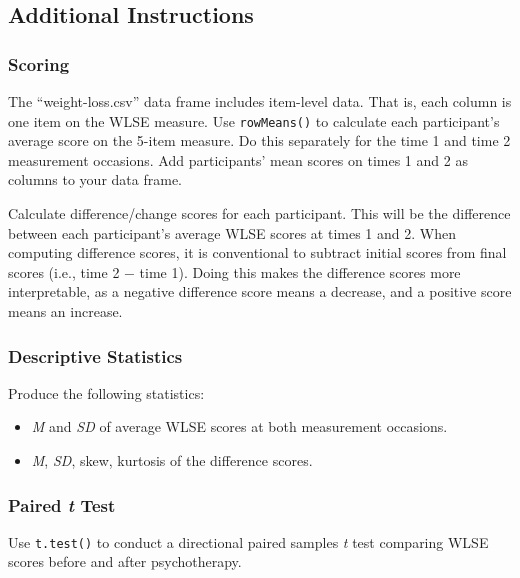 \documentclass[
]{book}
\providecommand{\tightlist}{%
  \setlength{\itemsep}{0pt}\setlength{\parskip}{0pt}}
\begin{document}
\hypertarget{pst-additional-instructions}{%
\subsection{Additional Instructions}\label{pst-additional-instructions}}

\hypertarget{pst-scoring}{%
\subsubsection{Scoring}\label{pst-scoring}}

The ``weight-loss.csv'' data frame includes item-level data. That is, each column is one item on the WLSE measure. Use \texttt{rowMeans()} to calculate each participant's average score on the 5-item measure. Do this separately for the time 1 and time 2 measurement occasions. Add participants' mean scores on times 1 and 2 as columns to your data frame.

Calculate difference/change scores for each participant. This will be the difference between each participant's average WLSE scores at times 1 and 2. When computing difference scores, it is conventional to subtract initial scores from final scores (i.e., time 2 − time 1). Doing this makes the difference scores more interpretable, as a negative difference score means a decrease, and a positive score means an increase.

\hypertarget{descriptive-statistics}{%
\subsubsection{Descriptive Statistics}\label{descriptive-statistics}}

Produce the following statistics:

\begin{itemize}
\tightlist
\item
  \emph{M} and \emph{SD} of average WLSE scores at both measurement occasions.
\item
  \emph{M}, \emph{SD}, skew, kurtosis of the difference scores.
\end{itemize}

\hypertarget{paired-t-test}{%
\subsubsection{\texorpdfstring{Paired \emph{t} Test}{Paired t Test}}\label{paired-t-test}}

Use \texttt{t.test()} to conduct a directional paired samples \emph{t} test comparing WLSE scores before and after psychotherapy.
\end{document}
